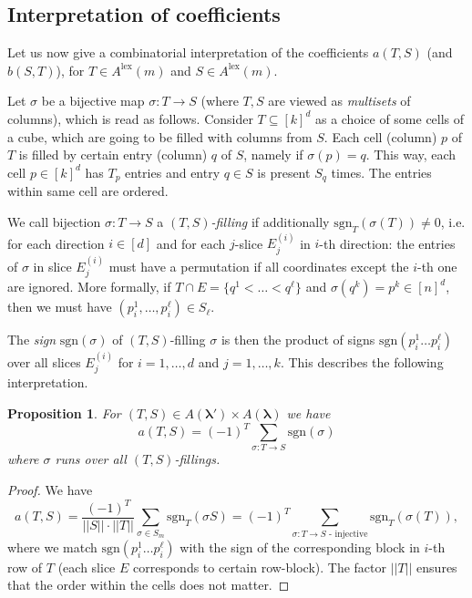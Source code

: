 \documentclass[12pt, reqno]{amsart}
\newtheorem{proposition}[theorem]{Proposition}
\theoremstyle{definition}
\newcommand{\sgn}{\mathrm{sgn}}
\begin{document}
\subsection{Interpretation of  coefficients}
Let us now give a combinatorial interpretation of the coefficients $a(T,S)$ (and $b(S, T)$), for $T\in A^{\mathrm{lex}}(m)$ and $S \in A^{\mathrm{lex}}(m)$.%

Let $\sigma$ be a bijective map $\sigma:T \to S$ (where $T, S$ are viewed as \textit{multisets} of columns), which is read as follows. 
Consider $T \subseteq [k]^d$ as a choice of some cells of a cube, which are going to be filled with columns from $S$. Each cell (column) $p$ of $T$ is filled by certain entry (column) $q$ of $S$, namely if $\sigma(p) = q$. This way, each cell $p \in [k]^d$ has $T_p$ entries and entry $q \in S$ is present $S_q$ times. The entries within same cell are ordered.

We call bijection $\sigma:T \to S$ a {\it $(T, S)$-filling} if additionally $\sgn_T(\sigma(T)) \neq 0$, i.e. for each direction $i \in [d]$ and for each $j$-slice $E^{(i)}_j$ in $i$-th direction: the entries of $\sigma$ in slice $E^{(i)}_j$ must have a permutation if all coordinates except the $i$-th one are ignored. More formally, if $T \cap E = \{q^1 < \ldots < q^\ell \}$ and $\sigma(q^{k}) = p^{k} \in [n]^d$, then we must have $(p^{1}_i,\ldots,p^{\ell}_i) \in S_\ell$.

The {\it sign} $\sgn(\sigma)$ of $(T,S)$-filling $\sigma$ is then the product of signs $\sgn(p^1_i \ldots p^\ell_i)$ over all slices $E^{(i)}_j$ for $i = 1,\ldots, d$ and $j = 1,\ldots, k$.
This describes the following interpretation.
\begin{proposition}\label{prop:interpretation}
    For $(T, S) \in A(\pmb{\lambda'}) \times A(\pmb{\lambda})$ we have 
    $$
        a(T,S) = (-1)^{T} \sum_{\sigma: T \to S} \sgn(\sigma)
    $$
    where $\sigma$ runs over all $(T,S)$-fillings. 
\end{proposition}
\begin{proof}
We have
$$
    a(T,S) = \frac{(-1)^T}{||S||\cdot ||T||} \sum_{\sigma \in S_m} \sgn_T(\sigma S) = (-1)^T\sum_{\sigma: T \to S\text{ - injective}} \sgn_T(\sigma(T)),
$$
where we match $\sgn(p^1_i \ldots p^\ell_i)$ with the sign of the corresponding block in $i$-th row of $T$ (each slice $E$ corresponds to certain row-block). The factor $||T||$ ensures that the order within the cells does not matter.
\end{proof}
\end{document}
